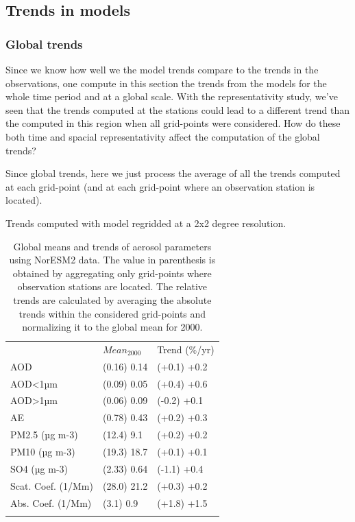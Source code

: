 \documentclass[journal abbreviation, manuscript]{copernicus}
\begin{document}
\subsection{Trends in models}

\subsubsection{Global trends}

Since we know how well we the model trends compare to the trends in the observations, one compute in this section the trends from the models for the whole time period and at a global scale. With the representativity study, we've seen that the trends computed at the stations could lead to a different trend than the computed in this region when all grid-points were considered. How do these both time and spacial representativity affect the computation of the global trends?

Since global trends, here we just process the average of all the trends computed at each grid-point (and at each grid-point where an observation station is located).

Trends computed with model regridded at a 2x2 degree resolution.

\begin{table}
 \begin{tabular}{lll}
  \tophline
                     & $Mean_{2000}$ & Trend (\%/yr) \\
  \middlehline
  AOD                & (0.16) 0.14   & (+0.1) +0.2   \\
  AOD<1µm            & (0.09) 0.05   & (+0.4) +0.6   \\
  AOD>1µm            & (0.06) 0.09   & (-0.2) +0.1   \\
  AE                 & (0.78) 0.43   & (+0.2) +0.3   \\
  PM2.5 (µg m-3)     & (12.4) 9.1    & (+0.2) +0.2   \\
  PM10 (µg m-3)      & (19.3) 18.7   & (+0.1) +0.1   \\
  SO4 (µg m-3)       & (2.33) 0.64   & (-1.1) +0.4   \\
  Scat. Coef. (1/Mm) & (28.0) 21.2   & (+0.3) +0.2   \\
  Abs. Coef. (1/Mm)  & (3.1) 0.9     & (+1.8) +1.5   \\
  \bottomhline
 \end{tabular}
 \caption{Global means and trends of aerosol parameters using NorESM2 data. The value in parenthesis is obtained by aggregating only grid-points where observation stations are located. The relative trends are calculated by averaging the absolute trends within the considered grid-points and normalizing it to the global mean for 2000.}
 \label{mod_tab_trends}
\end{table}
\end{document}
